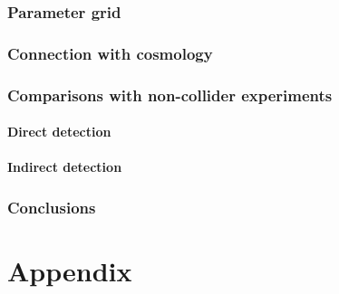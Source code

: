 \documentclass[a4paper, 11pt,notoc]{article}
\begin{document}
\section{Parameter grid}


\section{Connection with cosmology}


\section{Comparisons with non-collider experiments}
\subsection{Direct detection}

\subsection{Indirect detection}



\section{Conclusions}

 
\appendix
\part*{Appendix}
\end{document}

